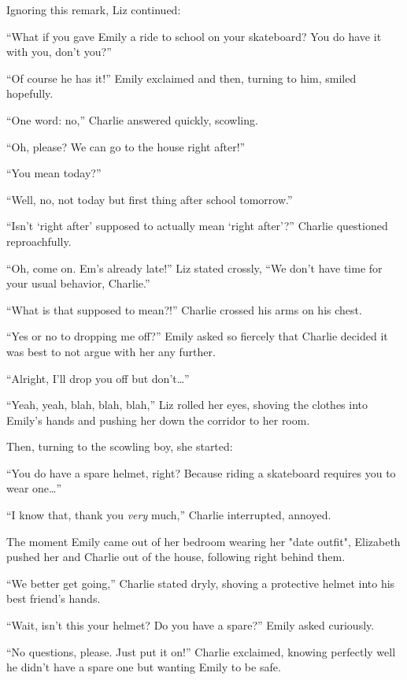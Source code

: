 Ignoring this remark, Liz continued:

“What if you gave Emily a ride to school on your skateboard? You do have it with you, don’t you?”

“Of course he has it!” Emily exclaimed and then, turning to him, smiled hopefully.

“One word: no,” Charlie answered quickly, scowling.

“Oh, please? We can go to the house right after!”

“You mean today?”

“Well, no, not today but first thing after school tomorrow.”

“Isn’t ‘right after’ supposed to actually mean ‘right after’?” Charlie questioned reproachfully.

“Oh, come on. Em’s already late!” Liz stated crossly, “We don’t have time for your usual behavior, Charlie.”

“What is that supposed to mean?!” Charlie crossed his arms on his chest.

“Yes or no to dropping me off?” Emily asked so fiercely that Charlie decided it was best to not argue with her any further.

“Alright, I’ll drop you off but don’t…”

“Yeah, yeah, blah, blah, blah,” Liz rolled her eyes, shoving the clothes into Emily’s hands and pushing her down the corridor to her room.

Then, turning to the scowling boy, she started:

“You do have a spare helmet, right? Because riding a skateboard requires you to wear one…”

“I know that, thank you \textit{very} much,” Charlie interrupted, annoyed.

The moment Emily came out of her bedroom wearing her "date outfit", Elizabeth pushed her and Charlie out of the house, following right behind them.

“We better get going,” Charlie stated dryly, shoving a protective helmet into his best friend’s hands.

“Wait, isn’t this your helmet? Do you have a spare?” Emily asked curiously.

“No questions, please. Just put it on!” Charlie exclaimed, knowing perfectly well he didn’t have a spare one but wanting Emily to be safe.